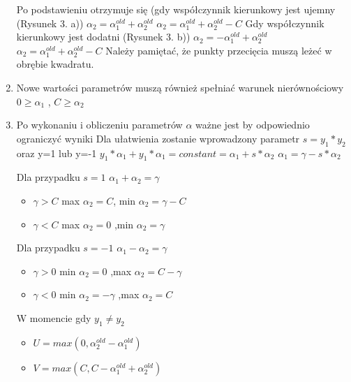 \documentclass[[10pt,a4paper]{article}
\begin{document}
\begin{enumerate}
Po podstawieniu otrzymuje się (gdy współczynnik kierunkowy jest ujemny (Rysunek 3. a))
\newline 
$\alpha_{2} = \alpha_{1}^{old} + \alpha_{2}^{old}$
$\alpha_{2} = \alpha_{1}^{old} + \alpha_{2}^{old}-C$
\newline Gdy współczynnik kierunkowy jest dodatni (Rysunek 3. b))
\newline
$\alpha_{2} = -\alpha_{1}^{old} + \alpha_{2}^{old}$
$\alpha_{2} = \alpha_{1}^{old} + \alpha_{2}^{old}-C$
\newline Należy pamiętać, że punkty przecięcia muszą leżeć w obrębie kwadratu. 

\item Nowe wartości parametrów muszą również spełniać warunek nierównościowy
$0\ge\alpha_{1}$ ,
$C\ge\alpha_{2}$
\item Po wykonaniu i obliczeniu parametrów  $\alpha$ ważne jest by odpowiednio ograniczyć wyniki
\newline 
Dla ułatwienia zostanie wprowadzony parametr $s=y_{1}*y_{2}$ oraz y=1 lub y=-1 
\newline 
$y_{1}*\alpha_{1} + y_{1}*\alpha_{1} = constant = \alpha_{1} + s*\alpha_{2}$
\newline
$\alpha_{1} = \gamma - s*\alpha_{2}$

Dla przypadku $s=1$   
 \newline $\alpha_{1}+\alpha_{2} = \gamma$
 \begin{itemize}
\item $\gamma > C $ max $\alpha_{2} = C $, min $ \alpha_{2} = \gamma - C$
\item $\gamma < C$  max $\alpha_{2} = 0$ ,min  $\alpha_{2} = \gamma$
\end{itemize}
Dla przypadku $s=-1$
\newline $\alpha_{1}-\alpha_{2} = \gamma$
\begin{itemize}
\item $\gamma > 0$ min $\alpha_{2} = 0 $ ,max  $\alpha_{2} = C -\gamma $
\item $\gamma < 0$ min $\alpha_{2} = -\gamma$ ,max  $\alpha_{2} = C$
\end{itemize}
W momencie gdy  $y_{1}\neq y_{2}$ 
\begin{itemize}
 \item$ U = max(0,\alpha_{2}^{old} - \alpha_{1}^{old})$
 \item$ V = max(C,C - \alpha_{1}^{old} + \alpha_{2}^{old})$
 \end{itemize}



\end{enumerate}
\end{document}
